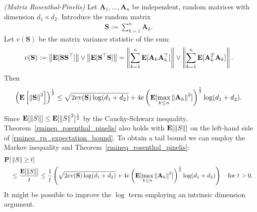 \begin{ftheorem}
  \emph{(Matrix Rosenthal-Pinelis)}
  \label{rmineq_rosenthal_pinelis}
  Let $\mathbf{A}_1, \ldots, \mathbf{A}_n$ be independent, random matrices with dimension 
  $d_1 \times d_2$.
    Introduce the random matrix
      \begin{gather*}
        \mathbf{S}:=\sum_{k=1}^n \mathbf{A}_k.
      \end{gather*}
    Let $v(\mathbf{S})$ be the matrix variance statistic of the sum:
      \begin{align}
        \label{rmineq_bernstein_cond_2}
        v(\mathbf{S}):= \left\lVert\mathbf{E}[\mathbf{S}\mathbf{S}^\top ]\right\rVert \lor \left\lVert\mathbf{E}[\mathbf{S}^\top \mathbf{S}]\right\rVert 
             = \left\lVert\sum_{k=1}^n\mathbf{E}[\mathbf{A}_k\mathbf{A}_k^\top]\right\rVert \lor \left\lVert\sum_{k=1}^n\mathbf{E}[\mathbf{A}_k^T \mathbf{A}_k]\right\rVert .
      \end{align}
    Then
      \begin{align}
        \label{rmineq_rp_expectation_bound}
        \left(
          \mathbf{E} \left[ \left\lVert\mathbf{S}\right\rVert^2 \right]
        \right)^{\frac{1}{2}}
        \le
        \sqrt{
          2ev(\mathbf{S})\log(d_1+d_2)
        } 
        + 
        4e \left( 
          \mathbf{E}[\max_{k \le n}\left\lVert\mathbf{A}_k\right\rVert^2]
        \right)^\frac{1}{2}
        \log(d_1+d_2).
      \end{align}
\end{ftheorem}

\begin{remark}
  Since
  $
    \mathbf{E}[\left\lVert S\right\rVert]
    \le
    \mathbf{E}[\left\lVert S\right\rVert^2]^\frac{1}{2}
  $
  by the Cauchy-Schwarz inequality,
  Theorem~\ref{rmineq_rosenthal_pinelis}
  also holds with 
  $
    \mathbf{E}[\left\lVert S\right\rVert]
  $
  on the left-hand side of \eqref{rmineq_rp_expectation_bound}.
  To obtain a tail bound we can employ the Markov inequality and 
  Theorem~\ref{rmineq_rosenthal_pinelis}:
  \begin{align}
    \label{rmineq_rp_tail_bound}
    \begin{split}
    \P[&\norm{S}\ge t]
    \\
       &\le
    \frac{
    \E[\norm{S}]
    }{t}
    \le
    \frac{1}{t}
    \left( 
        \sqrt{
          2ev(\mathbf{S})\log(d_1+d_2)
        } 
        + 
        4e \left( 
          \E[\max_{k \le n}\norm{\mathbf{A}_k}^2]
        \right)^\frac{1}{2}
        \log(d_1+d_2)
    \right)
    \quad
    \text{for}\ 
    t>0.
  \end{split}
  \end{align}
  It might be possible to improve the $\log$ term employing an intrinsic dimension argument.
\end{remark}
  
